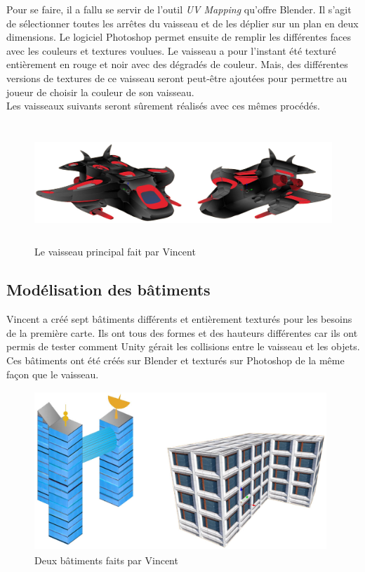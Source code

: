 \documentclass[10pt, titlepage]{report}
\begin{document}
Pour se faire, il a fallu se servir de l'outil \textit{UV Mapping} qu'offre Blender. Il s'agit de sélectionner toutes les arrêtes du vaisseau et de les déplier sur un plan en deux dimensions. Le logiciel Photoshop permet ensuite de remplir les différentes faces avec les couleurs et textures voulues. Le vaisseau a pour l'instant été texturé entièrement en rouge et noir avec des dégradés de couleur. Mais, des différentes versions de textures de ce vaisseau seront peut-être ajoutées pour permettre au joueur de choisir la couleur de son vaisseau.\\

Les vaisseaux suivants seront sûrement réalisés avec ces mêmes procédés.

\begin{figure}
\center
\includegraphics[height=4.5cm, width=15cm]{vaisseau_vincent.jpg}
\caption{Le vaisseau principal fait par Vincent}
\end{figure}
  
\subsection{Modélisation des bâtiments}

Vincent a créé sept bâtiments différents et entièrement texturés pour les besoins de la première carte. Ils ont tous des formes et des hauteurs différentes car ils ont permis de tester comment Unity gérait les collisions entre le vaisseau et les objets.\\

Ces bâtiments ont été créés sur Blender et texturés sur Photoshop de la même façon que le vaisseau.

\begin{figure}
\center
\includegraphics[height=6cm, width=11cm]{batiments_vincent.jpg}
\caption{Deux bâtiments faits par Vincent}
\end{figure}
\end{document}
